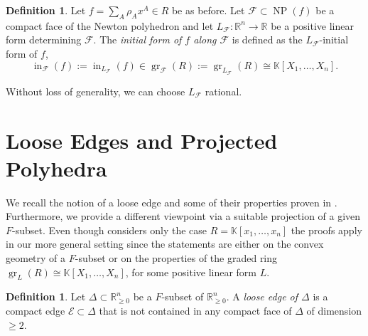 \documentclass[11pt]{amsart}
\theoremstyle{plain}
\theoremstyle{definition}
\newtheorem{Def}[Thm]{Definition}
\numberwithin{equation}{section}
\newcommand{\gr}{\operatorname{gr}}
\newcommand{\ini}{\operatorname{in}}
\newcommand{\NP}{\operatorname{NP}}
\renewcommand{\d}{\delta}
\renewcommand{\r}{\rho}
\newcommand{\D}{\Delta}
\newcommand{\KK}{{\mathbb K}}
\newcommand{\RR}{\mathbb R}
\newcommand{\cE}{\mathcal{E}}
\newcommand{\cF}{\mathcal{F}}
\newcommand{\Face}{\cF}
\newcommand{\Edge}{\cE}
\newcommand{\gqz}{{\geq 0}}
\renewcommand{\(}{(\!(}
\renewcommand{\)}{)\!)}
\begin{document}
\iffalse 	
The previous notions can be defined for any 
linear form, not necessarily positive.
Then the corresponding graded ring is not necessarily isomorphic to a polynomial ring over $ \KK $.
Since we do not need this here, we do not discuss this. 
\fi 
	
\begin{Def}
	Let $ f = \sum_A \r_A x^A \in R $ be as before.
	Let $ \Face \subset \NP(f) $ be a compact face of the Newton polyhedron
	and let $ L_\Face  : \RR^n \to \RR $ be a positive linear form determining $ \Face $.	
	The {\em initial form of $ f $ along $ \Face $} is defined as the $ L_\Face  $-initial form of $ f $,
	\[
	\ini_{\Face} (f) := \ini_{L_\Face} (f)
	\in \gr_{\Face} (R) := \gr_{L_\Face} (R) \cong \KK [X_1, \ldots, X_n].
	\]
\end{Def}	

Without loss of generality, we can choose $ L_\Face $ rational.








 
	
	
	
\smallskip 	

\section{Loose Edges and Projected Polyhedra}
\label{sec:3}

We recall the notion of a loose edge and some of their properties proven in \cite{GH}.
Furthermore, we provide a different viewpoint via a suitable projection of a given $ F $-subset.
Even though \cite{GH} considers only the case $ R = \KK[x_1, \ldots, x_n] $ the proofs apply in our more general setting since the statements are either on the convex geometry of a $ F $-subset or on the properties of the graded ring $ \gr_L(R) \cong \KK [X_1, \ldots, X_n]$,
for some positive linear form $ L $.  


\begin{Def}
	Let $ \D \subset \RR^n_\gqz $ be a $ F $-subset of $ \RR^n_\gqz $.
	A {\em loose edge of $ \D $} is a compact edge $ \Edge \subset \D $ that is not contained in any compact face of $ \D $ of dimension $ \geq 2 $. 
	\iffalse 
	A loose edge $ \Edge $ is called {\em descendant} if it is parallel to a vector $ \d = (\d_1, \ldots, \d_n ) \in \RR^n $ such that
	\[
		\d_i \geq 0, \ \ \mbox{ for } 1 \leq i \leq n - 1,
		\mbox{ and } 
		\d_n < 0.
	\]
	\fi 
\end{Def} 
\end{document}
